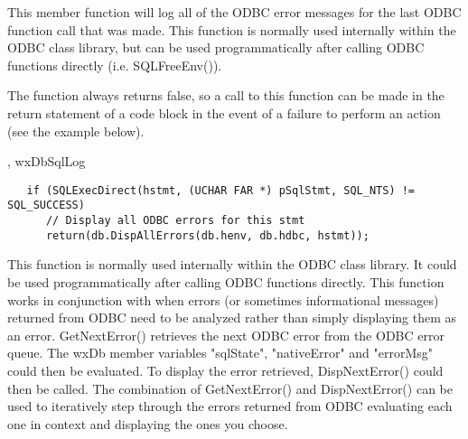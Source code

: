 




This member function will log all of the ODBC error messages for the last
ODBC function call that was made.  This function is normally used internally
within the ODBC class library, but can be used programmatically after calling
ODBC functions directly (i.e. SQLFreeEnv()).


The function always returns false, so a call to this function can be made
in the return statement of a code block in the event of a failure to
perform an action (see the example below).


, wxDbSqlLog


\begin{verbatim}
   if (SQLExecDirect(hstmt, (UCHAR FAR *) pSqlStmt, SQL_NTS) != SQL_SUCCESS)
      // Display all ODBC errors for this stmt
      return(db.DispAllErrors(db.henv, db.hdbc, hstmt));
\end{verbatim}

\label{wxdbdispnexterror}



This function is normally used internally within the ODBC class library.
It could be used programmatically after calling ODBC functions directly.  This
function works in conjunction with  when errors (or
sometimes informational messages)  returned from ODBC need to be analyzed
rather than simply displaying them as an error.  GetNextError() retrieves
the next ODBC error from the ODBC error queue.  The wxDb member variables
"sqlState", "nativeError" and "errorMsg" could then be evaluated.  To
display the error retrieved, DispNextError() could then be called.
The combination of GetNextError() and DispNextError() can be used to
iteratively step through the errors returned from ODBC evaluating each
one in context and displaying the ones you choose.

